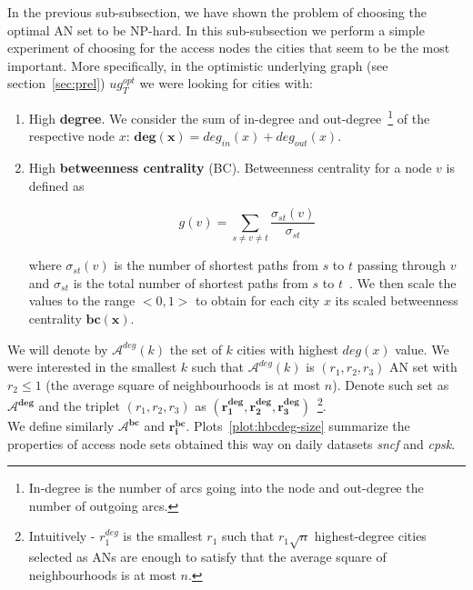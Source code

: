 		In the previous sub-subsection, we have shown the problem of choosing the optimal AN set to be NP-hard. In this sub-subsection we perform a simple experiment of choosing for the access nodes the cities that seem to be the most important. More specifically, in the optimistic underlying graph (see section~\ref{sec:prel}) $ug_{T}^{opt}$ we were looking for cities with:
		\begin{enumerate}
			\item High \textbf{degree}. We consider the sum of in-degree and out-degree~\footnote{In-degree is the number of arcs going into the node and out-degree the number of outgoing arcs.} of the respective node $x$: $\bm{deg(x)} = deg_{in}(x) + deg_{out}(x)$.
			\item High \textbf{betweenness centrality} (BC). Betweenness centrality for a node $v$ is defined as 
			
			$$g(v) = \sum_{s \neq v \neq t} \frac{\displaystyle \sigma_{st}(v)}{\displaystyle \sigma_{st}}$$
			
			where $\sigma_{st}(v)$ is the number of shortest paths from $s$ to $t$ passing through $v$ and $\sigma_{st}$ is the total number of shortest paths from $s$ to $t$~\cite{centrality01}. We then scale the values to the range $<0, 1>$ to obtain for each city $x$ its scaled betweenness centrality $\bm{bc(x)}$.
		\end{enumerate}
		\hspace*{\fill}
		
		\noindent We will denote by $\mathcal{A}^{deg}(k)$ the set of $k$ cities with highest $deg(x)$ value. We were interested in the smallest $k$ such that $\mathcal{A}^{deg}(k)$ is $(r_{1}, r_{2}, r_{3})$ AN set with $r_{2} \leq 1$ (the average square of neighbourhoods is at most $n$). Denote such set as $\bm{\mathcal{A}^{deg}}$ and the triplet $(r_{1}, r_{2}, r_{3})$ as $\bm{(r_{1}^{deg}, r_{2}^{deg}, r_{3}^{deg})}$~\footnote{Intuitively - $r_{1}^{deg}$ is the smallest $r_{1}$ such that $r_{1}\sqrt{n}$ highest-degree cities selected as ANs are enough to satisfy that the average square of neighbourhoods is at most $n$.}. \\
		
		\noindent We define similarly $\bm{\mathcal{A}^{bc}}$ and $\bm{r_{i}^{bc}}$. Plots~\ref{plot:hbcdeg-size} summarize the properties of access node sets obtained this way on daily datasets \textit{sncf} and \textit{cpsk}.
		
